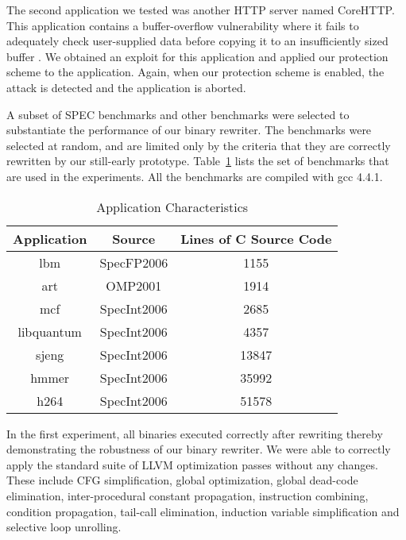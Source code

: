 
The second application we tested was another HTTP server named CoreHTTP. This application contains a buffer-overflow vulnerability where it fails to adequately check user-supplied data before copying it to an insufficiently sized buffer \cite{corehttp}. We obtained an exploit for this application and applied our protection scheme to the application. Again, when our protection scheme is enabled, the attack is detected and the application is aborted.

 A subset of SPEC benchmarks and
other benchmarks were selected to substantiate the performance of our
binary rewriter. The benchmarks were selected at random, and
are limited only by the criteria that they are correctly rewritten by
our still-early prototype. Table~\ref{benchlist} lists the set of
benchmarks that are used in the experiments. All the benchmarks are
compiled with gcc 4.4.1.


\begin{table}
\begin{center}
\begin{tabular}{ | c | c | c | }
\hline
\textbf{Application} & \textbf{Source} & \textbf{Lines of C Source Code} \\
\hline
\hline
lbm & SpecFP2006 & 1155 \\
\hline
art & OMP2001 & 1914 \\
\hline
mcf & SpecInt2006 & 2685 \\
\hline
libquantum & SpecInt2006 & 4357 \\
\hline
sjeng & SpecInt2006 & 13847 \\
\hline
hmmer & SpecInt2006 & 35992 \\
\hline
h264 & SpecInt2006 & 51578 \\
\hline
\end{tabular}
\end{center}

\caption{Application Characteristics}
\label{benchlist}
\end{table}

In the first experiment, all binaries executed correctly after
rewriting thereby demonstrating the robustness of our binary
rewriter. We were able to correctly apply the standard suite of LLVM
optimization passes without any changes. These include CFG
simplification, global optimization, global dead-code elimination,
inter-procedural constant propagation, instruction combining,
condition propagation, tail-call elimination, induction variable
simplification and selective loop unrolling.

